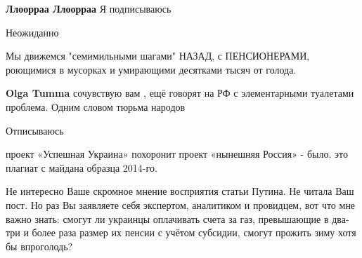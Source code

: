 \begin{itemize}
\begin{itemize}
\textbf{Ллоорраа Ллоорраа} Я подписываюсь
\end{itemize}

 
Неожиданно

 
Мы движемся "семимильными шагами" НАЗАД, с ПЕНСИОНЕРАМИ, роющимися в мусорках и
умирающими десятками тысяч от голода.

\begin{itemize}
 
\textbf{Olga Tumma} сочувствую вам , ещё говорят на РФ с элементарными туалетами проблема. Одним словом тюрьма народов
\end{itemize}

 
Отписываюсь

 
проект «Успешная Украина» похоронит проект «нынешняя Россия» - было. это плагиат с майдана образца 2014-го.

 

Не интересно Ваше скромное мнение восприятия статьи Путина. Не читала Ваш пост.
Но раз Вы заявляете себя экспертом, аналитиком и провидцем, вот что мне важно
знать: смогут ли украинцы оплачивать счета за газ, превышающие в два-три и
более раза размер их пенсии с учётом субсидии, смогут прожить зиму хотя бы
впроголодь?



\end{itemize}
